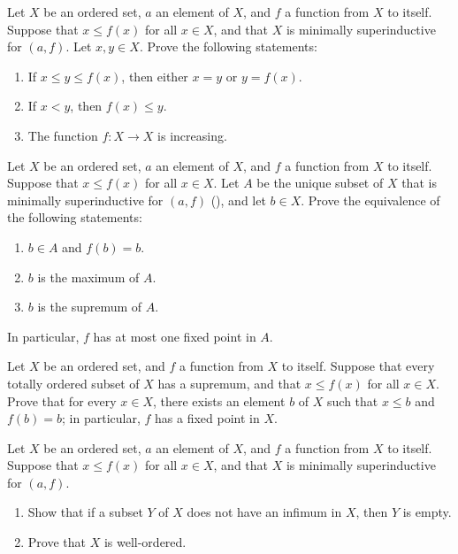 \documentclass{article}
\begin{document}
\begin{exercise}
  \label{exe:htz5ftfy}
  Let \(X\) be an ordered set, \(a\) an element of \(X\), and \(f\) a
  function from \(X\) to itself.  Suppose that \(x \leq f(x)\) for all
  \(x \in X\), and that \(X\) is minimally superinductive for
  \((a, f)\).  Let \(x, y \in X\).  Prove the following statements:
  \begin{enumerate}
  \item If \(x \leq y \leq f(x)\), then either \(x = y\) or
    \(y = f(x)\).
  \item If \(x < y\), then \(f(x) \leq y\).
  \item The function \(f : X \to X\) is increasing.
  \end{enumerate}
\end{exercise}

\begin{exercise}
  \label{exe:ycuba4tr}
  Let \(X\) be an ordered set, \(a\) an element of \(X\), and \(f\) a
  function from \(X\) to itself.  Suppose that \(x \leq f(x)\) for all
  \(x \in X\).  Let \(A\) be the unique subset of \(X\) that is
  minimally superinductive for \((a, f)\) (), and
  let \(b \in X\).  Prove the equivalence of the following statements:
  \begin{enumerate}
  \item \label{item:31iv9t84} \(b \in A\) and \(f(b) = b\).
  \item \label{item:zg0eno8k} \(b\) is the maximum of \(A\).
  \item \label{item:zhfu99x4} \(b\) is the supremum of \(A\).
  \end{enumerate}
  In particular, \(f\) has at most one fixed point in \(A\).
\end{exercise}

\begin{exercise}
  \label{exe:al7fffh1}
  Let \(X\) be an ordered set, and \(f\) a function from \(X\) to
  itself.  Suppose that every totally ordered subset of \(X\) has a
  supremum, and that \(x \leq f(x)\) for all \(x \in X\).  Prove that
  for every \(x \in X\), there exists an element \(b\) of \(X\) such
  that \(x \leq b\) and \(f(b) = b\); in particular, \(f\) has a fixed
  point in \(X\).
\end{exercise}

\begin{exercise}
  \label{exe:313bq61a}
  Let \(X\) be an ordered set, \(a\) an element of \(X\), and \(f\) a
  function from \(X\) to itself.  Suppose that \(x \leq f(x)\) for all
  \(x \in X\), and that \(X\) is minimally superinductive for
  \((a, f)\).
  \begin{enumerate}
  \item Show that if a subset \(Y\) of \(X\) does not have an infimum
    in \(X\), then \(Y\) is empty.
  \item Prove that \(X\) is well-ordered.
  \end{enumerate}
\end{exercise}
\end{document}
